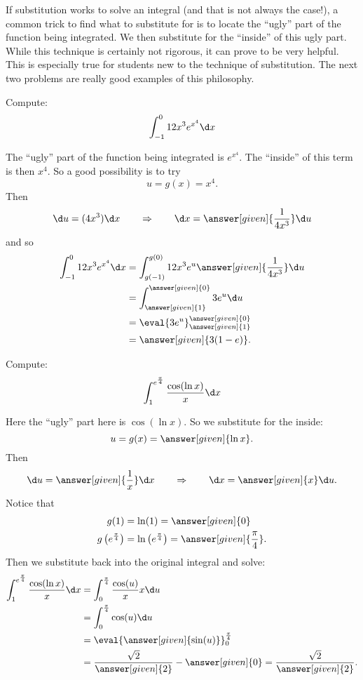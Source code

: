 \documentclass{ximera}
\begin{document}
If substitution works to solve an integral (and that is not always the
case!), a common trick to find what to substitute for is to locate the
``ugly'' part of the function being integrated.  We then substitute
for the ``inside'' of this ugly part.  While this technique is
certainly not rigorous, it can prove to be very helpful.  This is
especially true for students new to the technique of substitution.
The next two problems are really good examples of this philosophy.

\begin{example}
Compute:
\[
\int_{-1}^0 12x^3 e^{x^4} \d x
\]
\begin{explanation}
The ``ugly'' part of the function being integrated is $e^{x^4}$.  The
``inside'' of this term is then $x^4$.  So a good possibility is to
try
\[
u =g(x)= x^4.
\]
Then
\[
\d u = (4x^3) \d x 	\qquad	\Rightarrow	\qquad	\d x = \answer[given]{\frac{1}{4x^3}} \d u
\]
and so
\begin{align*}
\int_{-1}^0 12x^3 e^{x^4} \d x &= \int_{g(-1)}^{g(0)} 12 x^3 e^u \answer[given]{\frac{1}{4x^3}} \d u  \\
&= \int_{\answer[given]{1}}^{\answer[given]{0}} 3 e^u \d u  \\
&= \eval{3e^u}_{\answer[given]{1}}^{\answer[given]{0}}  \\
&= \answer[given]{3(1-e)}.
\end{align*}
\end{explanation}
\end{example}




\begin{example}
  Compute:
  \[
  \int_{1}^{e^{\frac{\pi}{4}}} \frac{\cos(\ln x)}{x} \d x
  \]
\begin{explanation}
Here the ``ugly'' part here is $\cos(\ln x)$.  So we substitute for
the inside:
\[
u=g(x)=\answer[given]{\ln x}.
\]
Then
\[
\d u =  \answer[given]{\frac{1}{x}} \d x 	\qquad	\Rightarrow	\qquad	\d x = \answer[given]{x} \d u.
\]
Notice that
\begin{align*}
g(1) &= \ln (1) = \answer[given]{0} \\
g \left( e^{\frac{\pi}{4}} \right) &= \ln \left( e^{\frac{\pi}{4}} \right) = \answer[given]{\frac{\pi}{4}}.
\end{align*}
Then we substitute back into the original integral and solve:
\begin{align*}
\int_{1}^{e^{\frac{\pi}{4}}} \frac{\cos(\ln x)}{x} \d x &= \int_0^{\frac{\pi}{4}} \frac{\cos(u)}{x} x \d u  \\
&= \int_0^{\frac{\pi}{4}} \cos(u) \d u  \\
&= \eval{\answer[given]{\sin(u)}}_{0}^{\frac{\pi}{4}}  \\
&= \frac{\sqrt{2}}{\answer[given]{2}} - \answer[given]{0} = \frac{\sqrt{2}}{\answer[given]{2}}.
\end{align*}
\end{explanation}
\end{example}
\end{document}
